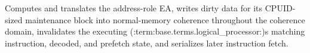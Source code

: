 Computes and translates the address-role EA, writes dirty data for its CPUID-sized maintenance block into normal-memory coherence throughout the coherence domain, invalidates the executing (:term:base.terms.logical_processor:)\textquotesingle{}s matching instruction, decoded, and prefetch state, and serializes later instruction fetch.
